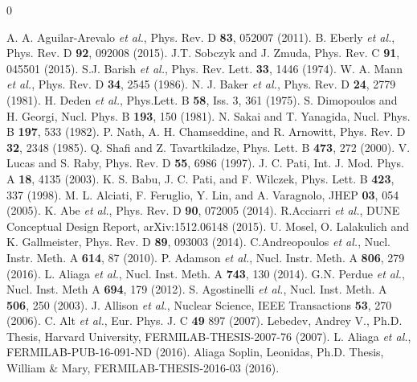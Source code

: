 \documentclass[aps,prl,preprint,showpacs,superscriptaddress,nofootinbib,floatfix,linenumbers]{revtex4}
\begin{document}
\begin{thebibliography}{0}

 A. A. Aguilar-Arevalo \textit{et al.}, Phys. Rev. D {\bf 83}, 052007 (2011).
 B. Eberly \textit{et al.}, Phys. Rev. D {\bf 92}, 092008 (2015).
 J.T. Sobczyk and J. Zmuda, Phys. Rev. C {\bf 91}, 045501 (2015).
 S.J. Barish \textit{et al.}, Phys. Rev. Lett. {\bf 33}, 1446 (1974).
 W. A. Mann \textit{et al.}, Phys. Rev. D {\bf 34}, 2545 (1986).
 N. J. Baker \textit{et al.}, Phys. Rev. D {\bf 24}, 2779 (1981).
 H. Deden \textit{et al.}, Phys.Lett. B {\bf 58}, Iss. 3, 361 (1975).
 S. Dimopoulos and H. Georgi, Nucl. Phys. B {\bf 193}, 150 (1981).
 N. Sakai and T. Yanagida, Nucl. Phys. B {\bf 197}, 533 (1982).
 P. Nath, A. H. Chamseddine, and R. Arnowitt, Phys. Rev. D {\bf 32}, 2348 (1985).
 Q. Shafi and Z. Tavartkiladze, Phys. Lett. B {\bf 473}, 272 (2000).
 V. Lucas and S. Raby, Phys. Rev. D {\bf 55}, 6986 (1997).
 J. C. Pati, Int. J. Mod. Phys. A {\bf 18}, 4135 (2003).
 K. S. Babu, J. C. Pati, and F. Wilczek, Phys. Lett. B {\bf 423}, 337 (1998).
 M. L. Alciati, F. Feruglio, Y. Lin, and A. Varagnolo, JHEP {\bf 03}, 054 (2005).
 K. Abe \textit{et al.}, Phys. Rev. D {\bf 90}, 072005 (2014).
 R.Acciarri \textit{et al.}, DUNE Conceptual Design Report,	arXiv:1512.06148 (2015).
 U. Mosel, O. Lalakulich and K. Gallmeister, Phys. Rev. D {\bf 89}, 093003 (2014).
 C.Andreopoulos \textit{et al.}, Nucl. Instr. Meth. A {\bf 614}, 87 (2010).
 P. Adamson \textit{et al.}, Nucl. Instr. Meth. A {\bf 806}, 279 (2016).
 L. Aliaga \textit{et al.}, Nucl. Inst. Meth. A {\bf 743}, 130 (2014).
 G.N. Perdue \textit{et al.}, Nucl. Inst. Meth A {\bf 694}, 179 (2012).
 S. Agostinelli \textit{et al.}, Nucl. Inst. Meth. A {\bf 506}, 250 (2003).
 J. Allison \textit{et al.}, Nuclear Science, IEEE Transactions {\bf 53}, 270 (2006).
 C. Alt \textit{et al.}, Eur. Phys. J. C {\bf 49} 897 (2007).
 Lebedev, Andrey V., Ph.D. Thesis, Harvard University, FERMILAB-THESIS-2007-76 (2007).
 L. Aliaga \textit{et al.}, FERMILAB-PUB-16-091-ND (2016).
 Aliaga Soplin, Leonidas, Ph.D. Thesis, William \& Mary, FERMILAB-THESIS-2016-03 (2016).

\end{thebibliography}
\end{document}
